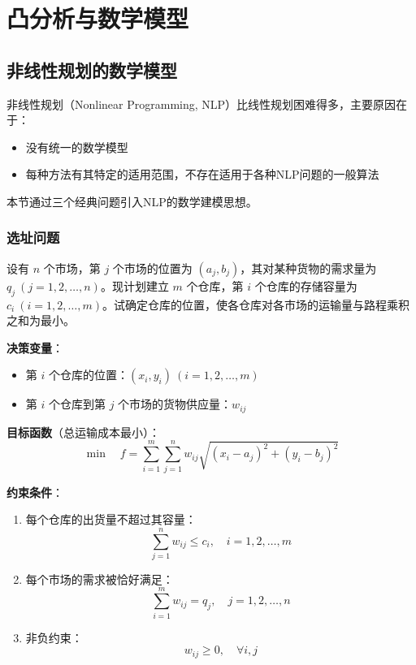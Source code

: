 \chapter{凸分析与数学模型}\label{chap:convex-analysis}
\section{非线性规划的数学模型}\label{sec:modeling}

\begin{notebox}[引言]
非线性规划（Nonlinear Programming, NLP）比线性规划困难得多，主要原因在于：
\begin{itemize}[itemsep=0.2em]
    \item 没有统一的数学模型
    \item 每种方法有其特定的适用范围，不存在适用于各种NLP问题的一般算法
\end{itemize}
本节通过三个经典问题引入NLP的数学建模思想。
\end{notebox}

\subsection{选址问题}

\begin{conceptbox}[问题描述]
设有 $n$ 个市场，第 $j$ 个市场的位置为 $(a_j, b_j)$，其对某种货物的需求量为 $q_j\ (j=1,2,\ldots,n)$。现计划建立 $m$ 个仓库，第 $i$ 个仓库的存储容量为 $c_i\ (i=1,2,\ldots,m)$。试确定仓库的位置，使各仓库对各市场的运输量与路程乘积之和为最小。
\end{conceptbox}

\textbf{决策变量}：
\begin{itemize}
    \item 第 $i$ 个仓库的位置：$(x_i, y_i)\ (i=1,2,\ldots,m)$
    \item 第 $i$ 个仓库到第 $j$ 个市场的货物供应量：$w_{ij}$
\end{itemize}

\textbf{目标函数}（总运输成本最小）：
\[
\min\quad f = \sum_{i=1}^{m} \sum_{j=1}^{n} w_{ij} \sqrt{(x_i - a_j)^2 + (y_i - b_j)^2}
\]

\textbf{约束条件}：
\begin{enumerate}[label=(\arabic*)]
    \item 每个仓库的出货量不超过其容量：
    \[\sum_{j=1}^{n} w_{ij} \leq c_i,\quad i=1,2,\ldots,m\]
    \item 每个市场的需求被恰好满足：
    \[\sum_{i=1}^{m} w_{ij} = q_j,\quad j=1,2,\ldots,n\]
    \item 非负约束：
    \[w_{ij} \geq 0,\quad \forall i,j\]
\end{enumerate}

